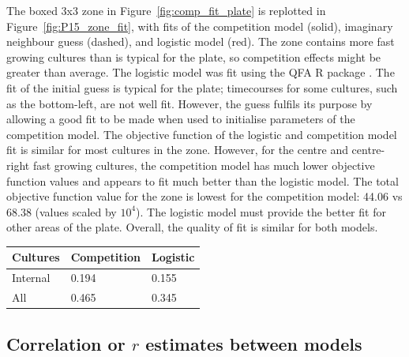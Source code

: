 The boxed 3x3 zone in Figure~\ref{fig:comp_fit_plate} is replotted in
Figure~\ref{fig:P15_zone_fit}, with fits of the competition model
(solid), imaginary neighbour guess (dashed), and logistic model
(red). The zone contains more fast growing cultures than is typical
for the plate, so competition effects might be greater than
average. The logistic model was fit using the QFA R package
\citep{qfa2016}. The fit of the initial guess is typical for the
plate; timecourses for some cultures, such as the bottom-left, are not
well fit. However, the guess fulfils its purpose by allowing a good
fit to be made when used to initialise parameters of the competition
model. The objective function of the logistic and competition model
fit is similar for most cultures in the zone. However, for the centre
and centre-right fast growing cultures, the competition model has much
lower objective function values and appears to fit much better than
the logistic model. The total objective function value for the zone is
lowest for the competition model: 44.06 vs 68.38 (values scaled by
\(10^{4}\)). The logistic model must provide the better fit for other
areas of the plate. Overall, the quality of fit is similar for both
models.

\begin{center}
  \begin{tabular}{l l l}
    \hline
    Cultures     & Competition & Logistic \\
    \hline
    Internal     & 0.194    & 0.155\\
    All          & 0.465    & 0.345\\
    \hline
  \end{tabular}
  \label{tab:P15_obj_fun}
\end{center}

\subsection{\boldmath Correlation or \(r\) estimates between models \unboldmath}

